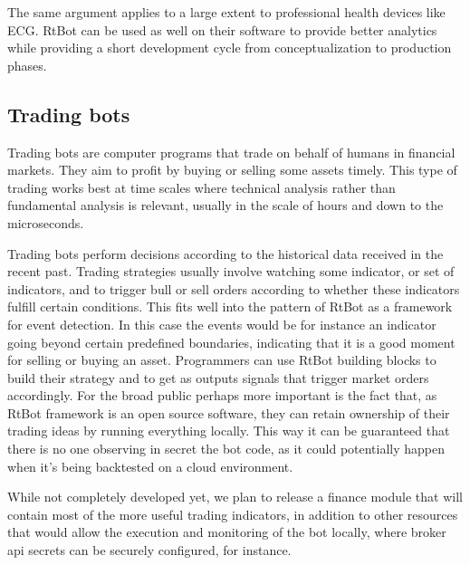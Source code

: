\documentclass[preprint,1p,times]{elsarticle}
\begin{document}
The same argument applies to a large extent to professional health devices like ECG. RtBot can be used as 
well on their software to provide better analytics while providing a short development cycle from 
conceptualization to production phases.

\subsection{Trading bots}

Trading bots are computer programs that trade on behalf of humans in financial markets. They aim to profit by 
buying or selling some assets timely. This type of trading works best at time scales where technical analysis 
rather than fundamental analysis is relevant, usually in the scale of hours and down to the microseconds.

Trading bots perform decisions according to the historical data received in the recent past. Trading strategies 
usually involve watching some indicator, or set of indicators, and to trigger bull or sell orders according to 
whether these indicators fulfill certain conditions. This fits well into the pattern of RtBot as a framework for 
event detection. In this case the events would be for instance an indicator going beyond certain predefined 
boundaries, indicating that it is a good moment for selling or buying an asset. Programmers can use RtBot building 
blocks to build their strategy and to get as outputs signals that trigger market orders accordingly. For the broad 
public perhaps more important is the fact that, as RtBot framework is an open source software, they can retain 
ownership of their trading ideas by running everything locally. This way it can be guaranteed that there is no one 
observing in secret the bot code, as it could potentially happen when it’s being backtested on a cloud environment.

While not completely developed yet, we plan to release a finance module that will contain most of the more useful 
trading indicators, in addition to other resources that would allow the execution and monitoring of the bot locally, 
where broker api secrets can be securely configured, for instance.






\begin{thebibliography}{00}


\bibitem{}

\end{thebibliography}
\end{document}

